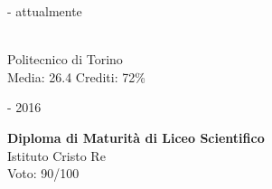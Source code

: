 \begin{minipage}{.3\textwidth}
	 - attualmente \faCalendar
\end{minipage}
\hfill
\begin{minipage}{.65\textwidth}
	\vfill
	 \\
	\color{Maroon} Politecnico di Torino \\
	\color{gray} Media: 26.4 \hspace{25px} Crediti: 72\% 
	\vfill
\end{minipage}

\bigskip

\begin{minipage}{.3\textwidth}
	 - 2016 \faCalendar
\end{minipage}
\hfill
\begin{minipage}{.64\textwidth}
	\vfill
	{\large \textbf{Diploma di Maturità di Liceo Scientifico}} \\
	\color{Maroon} Istituto Cristo Re \\
	\color{gray} Voto: 90/100
	\vfill
\end{minipage}